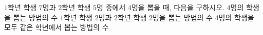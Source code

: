$1$학년 학생 $7$명과 $2$학년 학생 $5$명 중에서 $4$명을 뽑을 때, 다음을 구하시오.
 $4$명의 학생을 뽑는 방법의 수
 $1$학년 학생 $2$명과 $2$학년 학생 $2$명을 뽑는 방법의 수
 $4$명의 학생을 모두 같은 학년에서 뽑는 방법의 수
